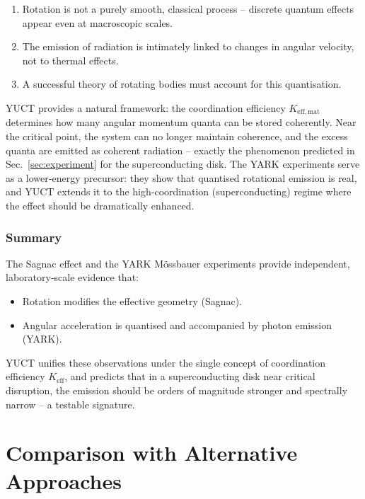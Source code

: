 \documentclass[12pt,a4paper]{article}
\begin{document}
\begin{enumerate}
	\item Rotation is not a purely smooth, classical process – discrete quantum effects appear even at macroscopic scales.
	\item The emission of radiation is intimately linked to changes in angular velocity, not to thermal effects.
	\item A successful theory of rotating bodies must account for this quantisation.
\end{enumerate}

YUCT provides a natural framework: the coordination efficiency \(K_{\mathrm{eff,mat}}\) determines how many angular momentum quanta can be stored coherently. Near the critical point, the system can no longer maintain coherence, and the excess quanta are emitted as coherent radiation – exactly the phenomenon predicted in Sec.~\ref{sec:experiment} for the superconducting disk. The YARK experiments serve as a lower‑energy precursor: they show that quantised rotational emission is real, and YUCT extends it to the high‑coordination (superconducting) regime where the effect should be dramatically enhanced.

\subsubsection{Summary}

The Sagnac effect and the YARK Mössbauer experiments provide independent, laboratory‑scale evidence that:
\begin{itemize}
	\item Rotation modifies the effective geometry (Sagnac).
	\item Angular acceleration is quantised and accompanied by photon emission (YARK).
\end{itemize}
YUCT unifies these observations under the single concept of coordination efficiency \(K_{\mathrm{eff}}\), and predicts that in a superconducting disk near critical disruption, the emission should be orders of magnitude stronger and spectrally narrow – a testable signature.

	\section{Comparison with Alternative Approaches}
	\label{sec:comparison}
	
\end{document}
